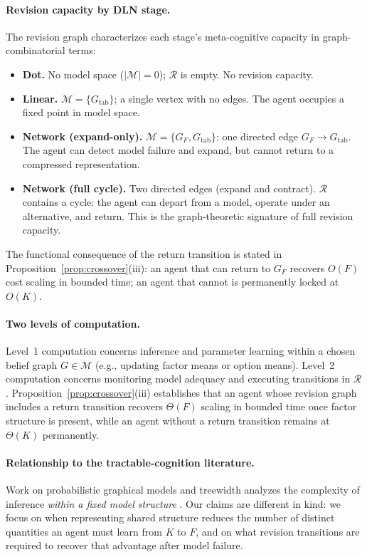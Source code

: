 \paragraph{Revision capacity by DLN stage.}
The revision graph characterizes each stage's meta-cognitive capacity in
graph-combinatorial terms:
%
\begin{itemize}[leftmargin=*]
\item \textbf{Dot.}  No model space ($|\mathcal{M}|=0$); $\mathcal{R}$
  is empty.  No revision capacity.
\item \textbf{Linear.}  $\mathcal{M} = \{G_{\mathrm{tab}}\}$; a single
  vertex with no edges.  The agent occupies a fixed point in model space.
\item \textbf{Network (expand-only).}  $\mathcal{M} =
  \{G_F, G_{\mathrm{tab}}\}$; one directed edge
  $G_F \to G_{\mathrm{tab}}$.  The agent can detect model failure and
  expand, but cannot return to a compressed representation.
\item \textbf{Network (full cycle).}  Two directed edges (expand and
  contract).  $\mathcal{R}$ contains a cycle: the agent can depart from a
  model, operate under an alternative, and return.  This is the
  graph-theoretic signature of full revision capacity.
\end{itemize}
%
The functional consequence of the return transition is stated in
Proposition~\ref{prop:crossover}(iii): an agent that can return to
$G_F$ recovers $O(F)$ cost scaling in bounded time; an agent that
cannot is permanently locked at $O(K)$.

\paragraph{Two levels of computation.}
Level~1 computation concerns inference and parameter learning within a chosen
belief graph $G\in\mathcal{M}$ (e.g., updating factor means or option means).
Level~2 computation concerns monitoring model adequacy and executing transitions
in $\mathcal{R}$.  Proposition~\ref{prop:crossover}(iii) establishes that an
agent whose revision graph includes a return transition recovers $\Theta(F)$
scaling in bounded time once factor structure is present, while an agent without
a return transition remains at $\Theta(K)$ permanently.

\paragraph{Relationship to the tractable-cognition literature.}
Work on probabilistic graphical models and treewidth analyzes the complexity of
inference \emph{within a fixed model structure} \cite{Pearl1988,vanRooij2008,Kwisthout2010}.
Our claims are different in kind: we focus on when representing shared
structure reduces the number of distinct quantities an agent must learn from $K$
to $F$, and on what revision transitions are required to recover that advantage
after model failure.

